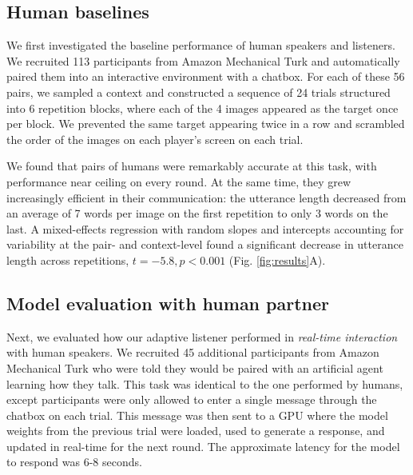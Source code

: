 \subsection{Human baselines}

We first investigated the baseline performance of human speakers and listeners. %
We recruited 113 participants from Amazon Mechanical Turk and automatically paired them into an interactive environment with a chatbox.
For each of these 56 pairs, we sampled a context and constructed a sequence of 24 trials structured into 6 repetition blocks, where each of the 4 images appeared as the target once per block. 
We prevented the same target appearing twice in a row and scrambled the order of the images on each player's screen on each trial. 

We found that pairs of humans were remarkably accurate at this task, with performance near ceiling on every round.
At the same time, they grew increasingly efficient in their communication: the utterance length decreased from an average of 7 words per image on the first repetition to only 3 words on the last.
A mixed-effects regression with random slopes and intercepts accounting for variability at the pair- and context-level found a significant decrease in utterance length across repetitions, $t=-5.8, p < 0.001$ (Fig. \ref{fig:results}A).

\subsection{Model evaluation with human partner}

Next, we evaluated how our adaptive listener performed in \emph{real-time interaction} with human speakers. 
We recruited 45 additional participants from Amazon Mechanical Turk who were told they would be paired with an artificial agent learning how they talk.
This task was identical to the one performed by humans, except participants were only allowed to enter a single message through the chatbox on each trial. 
This message was then sent to a GPU where the model weights from the previous trial were loaded, used to generate a response, and updated in real-time for the next round.
The approximate latency for the model to respond was 6-8 seconds.

